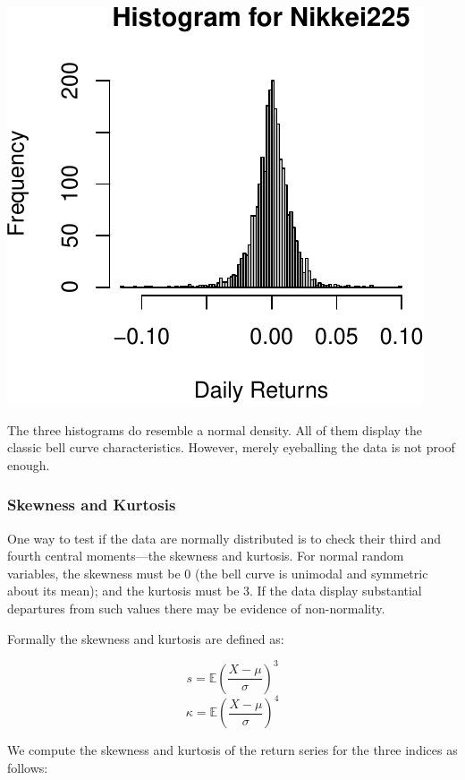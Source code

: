 \documentclass[11pt,]{article}
\begin{document}
\begin{center}\includegraphics{FMC_T4_PhD_Fin_Time_Series_files/figure-latex/histograms-3} \end{center}

The three histograms do resemble a normal density. All of them display
the classic bell curve characteristics. However, merely eyeballing the
data is not proof enough.

\subsubsection{Skewness and Kurtosis}\label{skewness-and-kurtosis}

One way to test if the data are normally distributed is to check their
third and fourth central moments---the skewness and kurtosis. For normal
random variables, the skewness must be 0 (the bell curve is unimodal and
symmetric about its mean); and the kurtosis must be 3. If the data
display substantial departures from such values there may be evidence of
non-normality.

Formally the skewness and kurtosis are defined as:

\[s = \mathbb{E}(\frac{X-\mu}{\sigma})^3\]
\[\kappa = \mathbb{E}(\frac{X-\mu}{\sigma})^4\]

We compute the skewness and kurtosis of the return series for the three
indices as follows:
\end{document}
